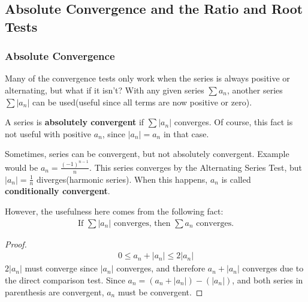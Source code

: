 \documentclass{article}
\begin{document}
\subsection{Absolute Convergence and the Ratio and Root Tests}
\subsubsection{Absolute Convergence}
Many of the convergence tests only work when the series is always positive or alternating, but what if it isn't? With any given series $\sum a_n$, another series $\sum |a_n|$ can be used(useful since all terms are now positive or zero).

A series is \textbf{absolutely convergent} if $\sum |a_n|$ converges. Of course, this fact is not useful with positive $a_n$, since $|a_n| = a_n$ in that case.

Sometimes, series can be convergent, but not absolutely convergent. Example would be $a_n = \frac{(-1)^{n-1}}{n}$. This series converges by the Alternating Series Test, but $|a_n| = \frac{1}{n}$ diverges(harmonic series). When this happens, $a_n$ is called \textbf{conditionally convergent}.

However, the usefulness here comes from the following fact:
\begin{gather*}
    \textrm{If } \sum |a_n| \textrm{ converges, then } \sum a_n \textrm{ converges.}
\end{gather*}
\begin{proof}
\begin{gather*}
    0 \leqslant a_n + |a_n| \leqslant 2|a_n|
\end{gather*}
$2|a_n|$ must converge since $|a_n|$ converges, and therefore $a_n + |a_n|$ converges due to the direct comparison test. Since $a_n = (a_n + |a_n|) - (|a_n|)$, and both series in parenthesis are convergent, $a_n$ must be convergent.
\end{proof}
\end{document}
